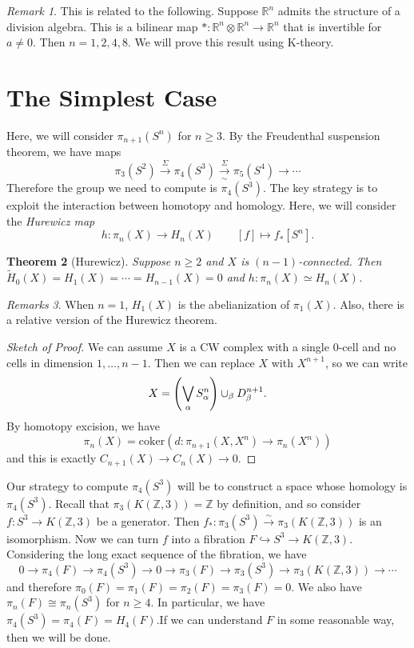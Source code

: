 \documentclass[leqno, openany]{memoir}
\newtheorem{thm}{Theorem}[section]
\theoremstyle{definition}
\theoremstyle{remark}
\newtheorem{rmk}[thm]{Remark}
\newtheorem{rmks}[thm]{Remarks}
\theoremstyle{plain}
\theoremstyle{definition}
\theoremstyle{remark}
\newcommand{\R}{\mathbb{R}}
\newcommand{\Z}{\mathbb{Z}}
\newcommand{\mr}[1]{\mathrm{#1}}
\newcommand{\wt}[1]{\widetilde{#1}}
\begin{document}
\begin{rmk}
    This is related to the following. Suppose $\R^n$ admits the structure of a division algebra. This is a bilinear map $* \colon \R^n \otimes \R^n \to \R^n$ that is invertible for $a \neq 0$. Then $n = 1,2,4,8$. We will prove this result using K-theory.
\end{rmk}

\section{The Simplest Case}%
\label{sec:the_simplest_case}

Here, we will consider $\pi_{n+1}(S^n)$ for $n \geq 3$. By the Freudenthal suspension theorem, we have maps
\[ \pi_3(S^2) \xrightarrow{\Sigma} \pi_4(S^3) \xrightarrow[\sim]{\Sigma} \pi_5(S^4) \to \cdots \]
Therefore the group we need to compute is $\pi_4(S^3)$. The key strategy is to exploit the interaction between homotopy and homology. Here, we will consider the \textit{Hurewicz map}
\[ h \colon \pi_n(X) \to H_n(X) \qquad [f] \mapsto f_* [S^n]. \]

\begin{thm}[Hurewicz]
    Suppose $n \geq 2$ and $X$ is $(n-1)$-connected. Then $\wt{H}_0(X) = H_1(X) = \cdots = H_{n-1}(X) = 0$ and $h \colon \pi_n(X) \simeq H_n(X)$.
\end{thm}

\begin{rmks}
    When $n = 1$, $H_1(X)$ is the abelianization of $\pi_1(X)$. Also, there is a relative version of the Hurewicz theorem.
\end{rmks}

\begin{proof}[Sketch of Proof]
    We can assume $X$ is a CW complex with a single $0$-cell and no cells in dimension $1, \ldots, n-1$. Then we can replace $X$ with $X^{n+1}$, so we can write
    \[ X = \qty( \bigvee_{\alpha} S_{\alpha}^n ) \cup_{\beta} D_{\beta}^{n+1}. \]
    By homotopy excision, we have
    \[ \pi_n(X) = \mr{coker}(d \colon \pi_{n+1}(X, X^n) \to \pi_n(X^n)) \]
    and this is exactly $C_{n+1}(X) \to C_n(X) \to 0$.
\end{proof}

Our strategy to compute $\pi_4(S^3)$ will be to construct a space whose homology is $\pi_4(S^3)$. Recall that $\pi_3(K(\Z, 3)) = \Z$ by definition, and so consider $f \colon S^3 \to K(\Z, 3)$ be a generator. Then $f_* \colon \pi_3(S^3) \xrightarrow{\sim} \pi_3(K(\Z, 3))$ is an isomorphism. Now we can turn $f$ into a fibration $F \hookrightarrow S^3 \to K(\Z, 3)$. Considering the long exact sequence of the fibration, we have
\[ 0 \to \pi_4(F) \to \pi_4(S^3) \to 0 \to \pi_3(F) \to \pi_3(S^3) \to \pi_3(K(\Z, 3)) \to \cdots \]
and therefore $\pi_0(F) = \pi_1(F) = \pi_2(F) = \pi_3(F) = 0$. We also have $\pi_n(F) \cong \pi_n(S^3)$ for $n \geq 4$. In particular, we have $\pi_4(S^3) = \pi_4(F) = H_4(F)$.If we can understand $F$ in some reasonable way, then we will be done.
\end{document}
